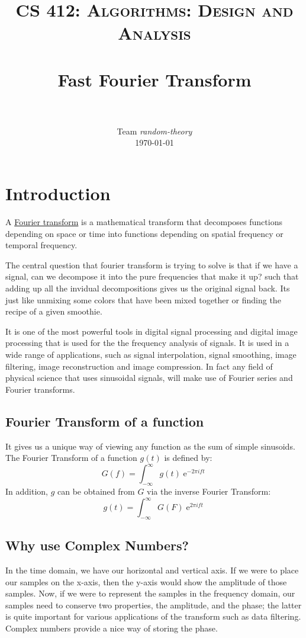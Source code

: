\documentclass[paper=a4, fontsize=11pt]{scrartcl}
\title{
		\usefont{OT1}{bch}{b}{n}
		\normalfont \normalsize \textsc{CS 412: Algorithms: Design and Analysis} \\ [25pt]
		\horrule{0.5pt} \\[0.4cm]
		\huge Fast Fourier Transform \\
		\horrule{2pt} \\[0.5cm]
}
\author{
		\normalfont 								\normalsize
        Team \textit{random-theory}\\[-3pt]		\normalsize
        \today
}
\date{}
\numberwithin{equation}{section}		%
\numberwithin{figure}{section}			%
\numberwithin{table}{section}				%
\begin{document}
\maketitle

\section{Introduction}
A \href{https://en.wikipedia.org/wiki/Fourier_transform}{Fourier transform} is a mathematical transform that decomposes functions depending on space or time into functions depending on spatial frequency or temporal frequency.

The central question that fourier transform is trying to solve is that if we have a signal, can we decompose it into the pure frequencies that make it up? such that adding up all the invidual decompositions gives us the original signal back. Its just like unmixing some colors that have been mixed together or finding the recipe of a given smoothie. 

It is one of the most powerful tools in digital signal processing and digital image processing that is used for the the frequency analysis of signals. It is used in a wide range of applications, such as signal interpolation, signal smoothing, image filtering, image reconstruction and image compression. In fact any field of physical science that uses sinusoidal signals, will make use of Fourier series and Fourier transforms. 

\subsection{Fourier Transform of a function}
It gives us a unique way of viewing any function as the sum of simple sinusoids. The Fourier Transform of a function $g(t)$ is defined by:
\begin{equation}
G\left( f \right) = \int_{-\infty}^{\infty} g\left(t\right) \operatorname{e}^{-2\pi ift}
\end{equation}
\newline 
In addition, $g$ can be obtained from $G$ via the inverse Fourier Transform:
\begin{equation}
g\left( t \right) = \int_{-\infty}^{\infty} G\left(F\right) \operatorname{e}^{2\pi ift}
\end{equation}

\subsection{Why use Complex Numbers?}
In the time domain, we have our horizontal and vertical axis. If we were to place our samples on the x-axis, then the y-axis would show the amplitude of those samples. Now, if we were to represent the samples in the frequency domain, our samples need to conserve two properties, the amplitude, and the phase; the latter is quite important for various applications of the transform such as data filtering. Complex numbers provide a nice way of storing the phase.
\end{document}
